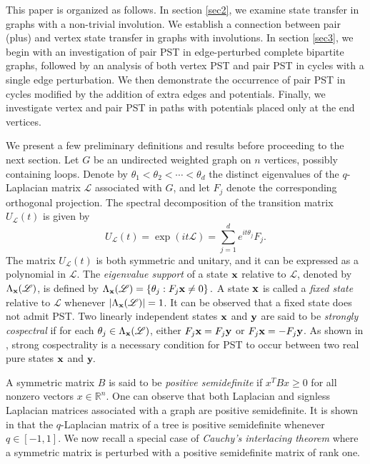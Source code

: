 \documentclass[12pt,a4paper]{article}
\def \x {{\bf x}}
\def \y {{\bf y}}
\begin{document}
This paper is organized as follows. In section \ref{sec2}, we examine state transfer in graphs with a non-trivial involution. We establish a connection between pair (plus) and vertex state transfer in graphs with involutions. In section \ref{sec3}, we begin with an investigation of pair PST in edge-perturbed complete bipartite graphs, followed by an analysis of both vertex PST and pair PST in cycles with a single edge perturbation. We then demonstrate the occurrence of pair PST in cycles modified by the addition of extra edges and potentials. Finally, we investigate vertex and pair PST in paths with potentials placed only at the end vertices.

We present a few preliminary definitions and results before proceeding to the next section. Let $G$ be an undirected weighted graph on $n$ vertices, possibly containing loops. Denote by $\theta_1 < \theta_2 < \cdots < \theta_d$ the distinct eigenvalues of the $q$-Laplacian matrix $\mathscr{L}$ associated with $G$, and let $F_j$ denote the corresponding orthogonal projection. The spectral decomposition of the transition matrix $U_\mathscr{L}(t)$ is given by
\[U_\mathscr{L}(t) = \exp{\left( i t \mathscr{L} \right)} = \sum_{j=1}^d e^{i t \theta_j} F_j.\]
The matrix $U_\mathscr{L}(t)$ is both symmetric and unitary, and it can be expressed as a polynomial in $\mathscr{L}$. The \emph{eigenvalue support} of a state $\x$ relative to $\mathscr{L}$, denoted by $\Lambda_\x(\mathscr{L})$, is defined by
$\Lambda_\x(\mathscr{L}) = \left\{ \theta_j : F_j \x \neq 0 \right\}.$ A state $\x$ is called a \emph{fixed state} relative to $\mathscr{L}$ whenever $|\Lambda_\x(\mathscr{L})| = 1$. It can be observed that a fixed state does not admit PST. Two linearly independent states $\x$ and $\y$ are said to be \emph{strongly cospectral} if for each $\theta_j \in \Lambda_\x(\mathscr{L})$, either $F_j \x = F_j \y$ or $F_j \x = - F_j \y$. As shown in \cite[Lemma 5.1(1)]{god25}, strong cospectrality is a necessary condition for PST to occur between two real pure states $\x$ and $\y.$

A symmetric matrix $B$ is said to be \emph{positive semidefinite} if $x^T B x \geq 0$ for all nonzero vectors $x \in \mathbb{R}^n$. One can observe that both Laplacian and signless Laplacian matrices associated with a graph are positive semidefinite. It is shown in \cite[Corollary 3.5]{bapat} that the $q$-Laplacian matrix of a tree is positive semidefinite whenever $q \in [-1,1]$. We now recall a special case of \emph{Cauchy's interlacing theorem} where a symmetric matrix is perturbed with a positive semidefinite matrix of rank one.
\end{document}
